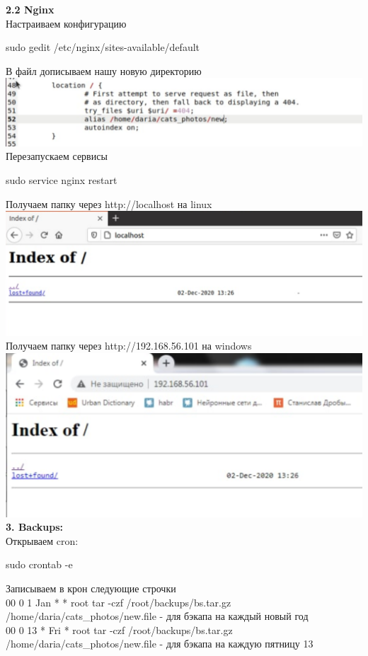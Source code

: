 \documentclass[12pt,a4paper]{scrartcl}
\begin{document}
\textnumero \textbf{2.2 Nginx} \\[5pt]
Настраиваем конфигурацию
\begin{center}
sudo gedit /etc/nginx/sites-available/default
\end{center}
В файл дописываем нашу новую директорию  \\[5pt]
\includegraphics[scale=10, width=15cm]{f15} \\[15pt]
Перезапускаем сервисы
\begin{center}
sudo service nginx restart
\end{center}
Получаем папку через http://localhost на linux \\[15pt]
\includegraphics[scale=10, width=15cm]{f16} \\[15pt]
Получаем папку через http://192.168.56.101 на windows  \\[15pt]
\includegraphics[scale=10, width=15cm]{f17} \\[15pt]
\textnumero \textbf{3. Backups:} \\[15pt]
Открываем cron:
\begin{center}
sudo crontab -e
\end{center}
Записываем в крон следующие строчки \\[15pt]

00 0 1 Jan * *  root tar -czf /root/backups/bs.tar.gz /home/daria/cats\_photos/new.file - для бэкапа на каждый новый год \\[15pt]

00 0 13 * Fri * root tar -czf /root/backups/bs.tar.gz /home/daria/cats\_photos/new.file - для бэкапа на каждую пятницу 13
\end{document}
